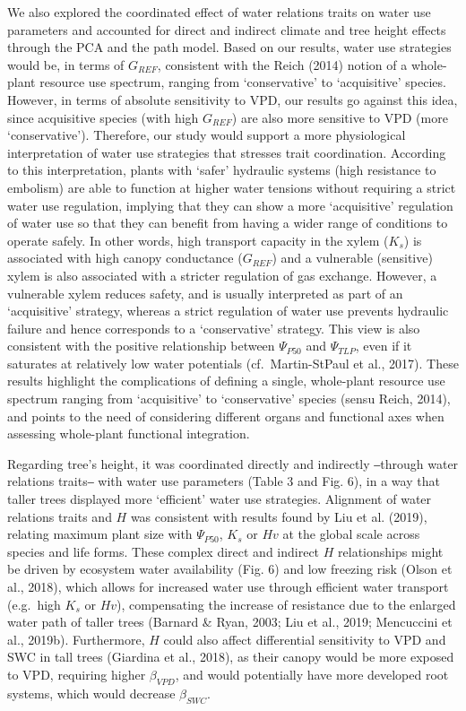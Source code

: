 \documentclass[11pt,twoside]{reedthesis}
\begin{document}
We also explored the coordinated effect of water relations traits on
water use parameters and accounted for direct and indirect climate and
tree height effects through the PCA and the path model. Based on our
results, water use strategies would be, in terms of \(G_{REF}\),
consistent with the Reich (2014) notion of a whole-plant resource use
spectrum, ranging from `conservative' to `acquisitive' species. However,
in terms of absolute sensitivity to VPD, our results go against this
idea, since acquisitive species (with high \(G_{REF}\)) are also more
sensitive to VPD (more `conservative'). Therefore, our study would
support a more physiological interpretation of water use strategies that
stresses trait coordination. According to this interpretation, plants
with `safer' hydraulic systems (high resistance to embolism) are able to
function at higher water tensions without requiring a strict water use
regulation, implying that they can show a more `acquisitive' regulation
of water use so that they can benefit from having a wider range of
conditions to operate safely. In other words, high transport capacity in
the xylem (\(K_s\)) is associated with high canopy conductance
(\(G_{REF}\)) and a vulnerable (sensitive) xylem is also associated with
a stricter regulation of gas exchange. However, a vulnerable xylem
reduces safety, and is usually interpreted as part of an `acquisitive'
strategy, whereas a strict regulation of water use prevents hydraulic
failure and hence corresponds to a `conservative' strategy. This view is
also consistent with the positive relationship between \(\Psi_{P50}\)
and \(\Psi_{TLP}\), even if it saturates at relatively low water
potentials (cf.~Martin-StPaul et al., 2017). These results highlight the
complications of defining a single, whole-plant resource use spectrum
ranging from `acquisitive' to `conservative' species (sensu Reich,
2014), and points to the need of considering different organs and
functional axes when assessing whole-plant functional integration.\par

Regarding tree's height, it was coordinated directly and indirectly
‒through water relations traits‒ with water use parameters (Table 3 and
Fig. 6), in a way that taller trees displayed more `efficient' water use
strategies. Alignment of water relations traits and \(H\) was consistent
with results found by Liu et al. (2019), relating maximum plant size
with \(\Psi_{P50}\), \(K_s\) or \(Hv\) at the global scale across
species and life forms. These complex direct and indirect \(H\)
relationships might be driven by ecosystem water availability (Fig. 6)
and low freezing risk (Olson et al., 2018), which allows for increased
water use through efficient water transport (e.g.~high \(K_s\) or
\(Hv\)), compensating the increase of resistance due to the enlarged
water path of taller trees (Barnard \& Ryan, 2003; Liu et al., 2019;
Mencuccini et al., 2019b). Furthermore, \(H\) could also affect
differential sensitivity to VPD and SWC in tall trees (Giardina et al.,
2018), as their canopy would be more exposed to VPD, requiring higher
\(\beta_{VPD}\), and would potentially have more developed root systems,
which would decrease \(\beta_{SWC}\).\par
\end{document}
